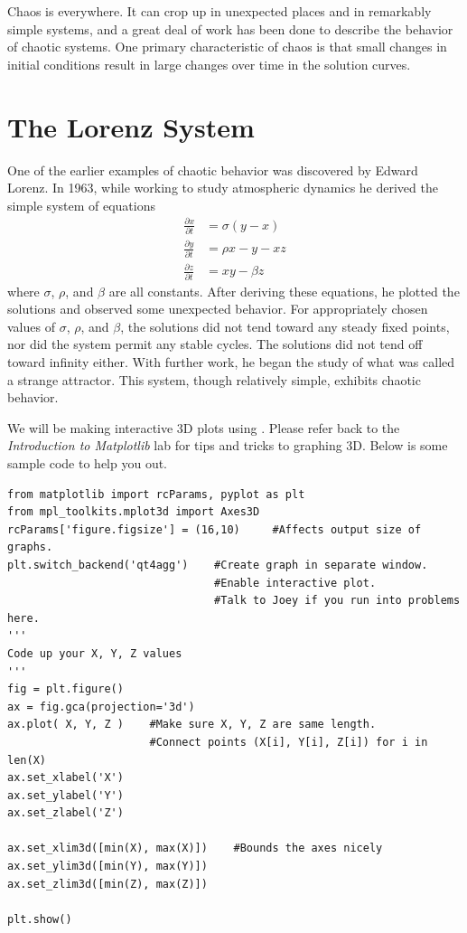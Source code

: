 
Chaos is everywhere.
It can crop up in unexpected places and in remarkably simple systems, and a great deal of work has been done to describe the behavior of chaotic systems.
One primary characteristic of chaos is that small changes in initial conditions result in large changes over time in the solution curves.

\section*{The Lorenz System}
One of the earlier examples of chaotic behavior was discovered by Edward Lorenz.
In 1963, while working to study atmospheric dynamics he derived the simple system of equations
\begin{align*}
\frac{\partial x}{\partial t} &= \sigma \left(y - x\right) \\
\frac{\partial y}{\partial t} &= \rho x - y - x z \\
\frac{\partial z}{\partial t} &= x y - \beta z
\end{align*}
where $\sigma$, $\rho$, and $\beta$ are all constants.
After deriving these equations, he plotted the solutions and observed some unexpected behavior.
For appropriately chosen values of $\sigma$, $\rho$, and $\beta$, the solutions did not tend toward any steady fixed points, nor did the system permit any stable cycles.
The solutions did not tend off toward infinity either.
With further work, he began the study of what was called a strange attractor.
This system, though relatively simple, exhibits chaotic behavior.

\begin{warn}
We will be making interactive 3D plots using .
Please refer back to the \textit{Introduction to Matplotlib} lab for tips and tricks to graphing 3D.
Below is some sample code to help you out.
\begin{lstlisting}
from matplotlib import rcParams, pyplot as plt
from mpl_toolkits.mplot3d import Axes3D
rcParams['figure.figsize'] = (16,10)     #Affects output size of graphs.
plt.switch_backend('qt4agg')    #Create graph in separate window.
                                #Enable interactive plot.
                                #Talk to Joey if you run into problems here.
'''
Code up your X, Y, Z values
'''
fig = plt.figure()
ax = fig.gca(projection='3d')
ax.plot( X, Y, Z )    #Make sure X, Y, Z are same length.
                      #Connect points (X[i], Y[i], Z[i]) for i in len(X)
ax.set_xlabel('X')
ax.set_ylabel('Y')
ax.set_zlabel('Z')

ax.set_xlim3d([min(X), max(X)])    #Bounds the axes nicely
ax.set_ylim3d([min(Y), max(Y)])
ax.set_zlim3d([min(Z), max(Z)])

plt.show()
\end{lstlisting}

\end{warn}

